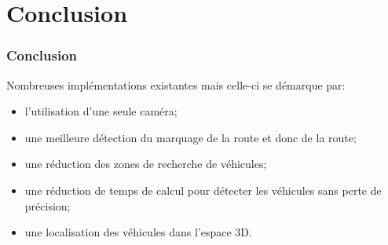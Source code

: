 \section{Conclusion}
\begin{frame}
\frametitle{Conclusion}

Nombreuses implémentations existantes mais celle-ci se démarque par:
\begin{itemize}
    \item l'utilisation d'une seule caméra;
    \item une meilleure détection du marquage de la route et donc de la route;
    \item une réduction des zones de recherche de véhicules;
    \item une réduction de temps de calcul pour détecter les véhicules sans perte de précision;
    \item une localisation des véhicules dans l'espace 3D.
\end{itemize}

\end{frame}
